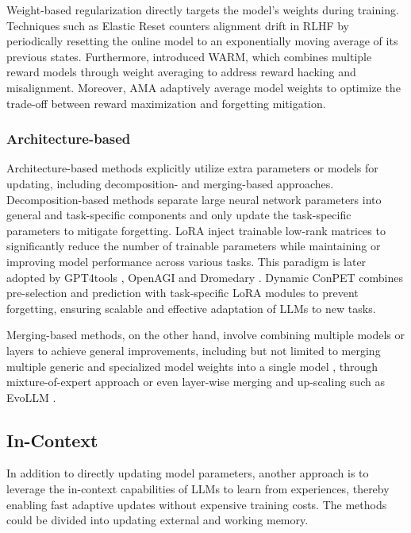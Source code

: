 \documentclass[sn-basic, Numbered]{sn-jnl}%
\theoremstyle{thmstyleone}%
\theoremstyle{thmstyletwo}%
\theoremstyle{thmstylethree}%
\begin{document}
Weight-based regularization \cite{kirkpatrick2017overcoming} directly targets the model's weights during training. Techniques such as Elastic Reset \cite{noukhovitch2024language} counters alignment drift in RLHF by periodically resetting the online model to an exponentially moving average of its previous states. Furthermore, \citet{rame2024warm} introduced WARM, which combines multiple reward models through weight averaging to address reward hacking and misalignment. Moreover, AMA \cite{lin2024mitigating} adaptively average model weights to optimize the trade-off between reward maximization and forgetting mitigation.
    
\subsubsection{Architecture-based}
Architecture-based methods explicitly utilize extra parameters or models for updating, including decomposition- and merging-based approaches.
Decomposition-based methods separate large neural network parameters into general and task-specific components and only update the task-specific parameters to mitigate forgetting. LoRA \cite{hu2021lora, dettmers2024qlora} inject trainable low-rank matrices to significantly reduce the number of trainable parameters while maintaining or improving model performance across various tasks. This paradigm is later adopted by GPT4tools \cite{yang2024gpt4tools}, OpenAGI \cite{ge2024openagi} and Dromedary \cite{sun2024principle}. Dynamic ConPET \cite{song2023conpet} combines pre-selection and prediction with task-specific LoRA modules to prevent forgetting, ensuring scalable and effective adaptation of LLMs to new tasks.

Merging-based methods, on the other hand, involve combining multiple models or layers to achieve general improvements, including but not limited to merging multiple generic and specialized model weights into a single model \cite{wortsman2022model, ilharco2022editing, yu2023language, yadav2024ties}, through mixture-of-expert approach \cite{ding2024mastering} or even layer-wise merging and up-scaling such as EvoLLM \cite{akiba2024evolutionary}. 




\subsection{In-Context}
In addition to directly updating model parameters, another approach is to leverage the in-context capabilities of LLMs to learn from experiences, thereby enabling fast adaptive updates without expensive training costs. The methods could be divided into updating external and working memory.
\end{document}

